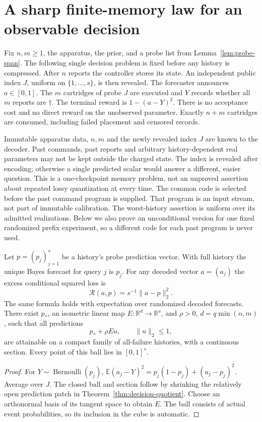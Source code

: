 \section{A sharp finite-memory law for an observable decision}\label{sec:memory-risk}
Fix $n,m\ge1$, the apparatus, the prior, and a probe list from
Lemma~\ref{lem:probe-span}. The following single decision problem is fixed
before any history is compressed. After $n$ reports the controller stores
its state. An independent public index $J$, uniform on $\{1,\ldots,s\}$,
is then revealed. The forecaster announces $a\in[0,1]$. The $m$ cartridges
of probe $J$ are executed and $Y$ records whether all $m$ reports are
$\dagger$. The terminal reward is $1-(a-Y)^2$. There is no acceptance
cost and no direct reward on the unobserved parameter. Exactly $n+m$
cartridges are consumed, including failed placement and censored records.

Immutable apparatus data, $n,m$ and the newly revealed index $J$ are known
to the decoder. Past commands, past reports and arbitrary history-dependent
real parameters may not be kept outside the charged state. The index is
revealed after encoding; otherwise a single predicted scalar would answer
a different, easier question. This is a one-checkpoint memory problem,
not an unproved assertion about repeated lossy quantization at every time.
The common code is selected before the past command program is supplied.
That program is an input stream, not part of immutable calibration. The
worst-history assertion is uniform over its admitted realizations. Below
we also prove an unconditional version for one fixed randomized prefix
experiment, so a different code for each past program is never used.

\begin{lemma}\label{lem:score-metric}
Let $p=(p_j)_{j=1}^s$ be a history's probe prediction vector. With full
history the unique Bayes forecast for query $j$ is $p_j$. For any decoded
vector $a=(a_j)$ the excess conditional squared loss is
\begin{equation}\label{eq:score-risk}
 \mathcal R(a,p)=s^{-1}\|a-p\|_2^2.
\end{equation}
The same formula holds with expectation over randomized decoded forecasts.
There exist $p_*$, an isometric linear map $E:\mathbb R^d\to\mathbb R^s$,
and $\rho>0$, $d=q\min(n,m)$, such that all predictions
\begin{equation}\label{eq:prediction-ball}
 p_*+\rho E u,\qquad \|u\|_2\le1,
\end{equation}
are attainable on a compact family of all-failure histories, with a
continuous section. Every point of this ball lies in $[0,1]^s$.
\end{lemma}
\begin{proof}
For $Y\sim\operatorname{Bernoulli}(p_j)$,
$\mathbb E(a_j-Y)^2=p_j(1-p_j)+(a_j-p_j)^2$. Average over $J$.
The closed ball and section follow by shrinking the relatively open
prediction patch in Theorem~\ref{thm:decision-quotient}. Choose an
orthonormal basis of its tangent space to obtain $E$. The ball consists
of actual event probabilities, so its inclusion in the cube is automatic.
\end{proof}

